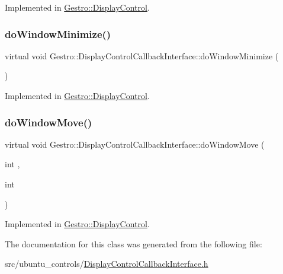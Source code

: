 Implemented in \hyperlink{classGestro_1_1DisplayControl_a210411b559d8c3ffb1498f49cfa26a6d}{Gestro\+::\+Display\+Control}.

\mbox{\label{classGestro_1_1DisplayControlCallbackInterface_a677aa306f08c548396a048c680bf5e10}} 
\subsubsection{\texorpdfstring{do\+Window\+Minimize()}{doWindowMinimize()}}
{\footnotesize\ttfamily virtual void Gestro\+::\+Display\+Control\+Callback\+Interface\+::do\+Window\+Minimize (\begin{DoxyParamCaption}{ }\end{DoxyParamCaption})\hspace{0.3cm}{\ttfamily [pure virtual]}}



Implemented in \hyperlink{classGestro_1_1DisplayControl_ad5fa763a77c680ce7b2089c6d79c4eb7}{Gestro\+::\+Display\+Control}.

\mbox{\label{classGestro_1_1DisplayControlCallbackInterface_a5232eef7102a1db6d227189132c92ebd}} 
\subsubsection{\texorpdfstring{do\+Window\+Move()}{doWindowMove()}}
{\footnotesize\ttfamily virtual void Gestro\+::\+Display\+Control\+Callback\+Interface\+::do\+Window\+Move (\begin{DoxyParamCaption}\item[{int}]{,  }\item[{int}]{ }\end{DoxyParamCaption})\hspace{0.3cm}{\ttfamily [pure virtual]}}



Implemented in \hyperlink{classGestro_1_1DisplayControl_aca4208c53cac28e164e7949effdc04cd}{Gestro\+::\+Display\+Control}.



The documentation for this class was generated from the following file\+:\begin{DoxyCompactItemize}
\item 
src/ubuntu\+\_\+controls/\hyperlink{DisplayControlCallbackInterface_8h}{Display\+Control\+Callback\+Interface.\+h}\end{DoxyCompactItemize}
